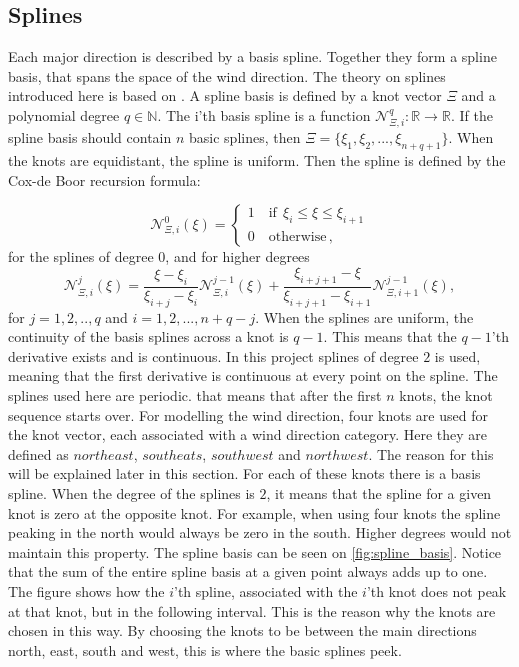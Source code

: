 \subsection{Splines}
Each major direction is described by a basis spline. Together they form a spline basis, that spans the space of the wind direction. The theory on splines introduced here is based on \cite{Splines}. A spline basis is defined by a knot vector $\Xi$ and a polynomial degree $q\in \mathbb{N}$. The i'th basis spline is a function $\mathcal{N}^q_{\Xi,i}: \mathbb{R} \rightarrow \mathbb{R}$. If the spline basis should contain $n$ basic splines, then $\Xi=\{\xi_1, \xi_2,...,\xi_{n+q+1}\}$. When the knots are equidistant, the spline is uniform. Then the spline is defined by the Cox-de Boor recursion formula:

\begin{equation}
    \mathcal{N}_{\Xi,i}^0 (\xi) =
    \begin{cases}
    1 \quad \text{if} \ \ \xi_i \leq \xi \leq \xi_{i+1}\\
    0 \quad \text{otherwise}\,,
    \end{cases}
\end{equation}
for the splines of degree $0$, and for higher degrees
    \begin{equation}
        \mathcal{N}_{\Xi,i}^j(\xi) = \frac{\xi-\xi_i}{\xi_{i+j}-\xi_i}\mathcal{N}_{\Xi,i}^{j-1}(\xi) + \frac{\xi_{i+j+1}-\xi}{\xi_{i+j+1}-\xi_{i+1}} \mathcal{N}_{\Xi, i + 1}^{j-1}(\xi),
    \end{equation}
for $j=1,2,..,q$ and $i=1,2,...,n+q-j$. When the splines are uniform, the continuity of the basis splines across a knot is $q-1$. This means that the $q-1$'th derivative exists and is continuous. In this project splines of degree $2$ is used, meaning that the first derivative is continuous at every point on the spline. The splines used here are periodic. that means that after the first $n$ knots, the knot sequence starts over. For modelling the wind direction, four knots are used for the knot vector, each associated with a wind direction category.  Here they are defined as $northeast$, $southeats$, $southwest$ and $northwest$. The reason for this will be explained later in this section. For each of these knots there is a basis spline. When the degree of the splines is $2$, it means that the spline for a given knot is zero at the opposite knot. For example, when using four knots the spline peaking in the north would always be zero in the south. Higher degrees would not maintain this property. The spline basis can be seen on \cref{fig:spline_basis}. Notice that the sum of the entire spline basis at a given point always adds up to one. The figure shows how the $i$'th spline, associated with the $i$'th knot does not peak at that knot, but in the following interval. This is the reason why the knots are chosen in this way. By choosing the knots to be between the main directions north, east, south and west, this is where the basic splines peek.



